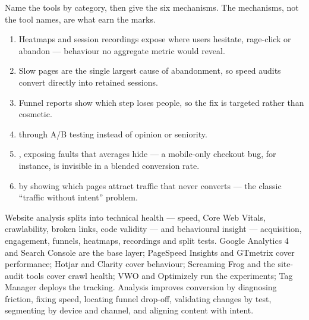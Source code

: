 \documentclass{MMTextbook}
\begin{document}
\begin{exambox}
Name the tools by category, then give the six mechanisms. The mechanisms, not
the tool names, are what earn the marks.

\begin{enumerate}
\item {} Heatmaps and session recordings expose where
      users hesitate, rage-click or abandon --- behaviour no aggregate metric
      would reveal.
\item {} Slow pages are the single largest cause of
      abandonment, so speed audits convert directly into retained sessions.
\item {} Funnel reports show which
      step loses people, so the fix is targeted rather than cosmetic.
\item {} through A/B testing instead of
      opinion or seniority.
\item {}, exposing faults that
      averages hide --- a mobile-only checkout bug, for instance, is invisible
      in a blended conversion rate.
\item {} by showing which pages attract traffic
      that never converts --- the classic ``traffic without intent'' problem.
\end{enumerate}
\end{exambox}

\begin{summarybox}
Website analysis splits into technical health --- speed, Core Web Vitals,
crawlability, broken links, code validity --- and behavioural insight ---
acquisition, engagement, funnels, heatmaps, recordings and split tests. Google
Analytics 4 and Search Console are the base layer; PageSpeed Insights and
GTmetrix cover performance; Hotjar and Clarity cover behaviour; Screaming Frog
and the site-audit tools cover crawl health; VWO and Optimizely run the
experiments; Tag Manager deploys the tracking. Analysis improves conversion by
diagnosing friction, fixing speed, locating funnel drop-off, validating changes
by test, segmenting by device and channel, and aligning content with intent.
\end{summarybox}

\end{document}
